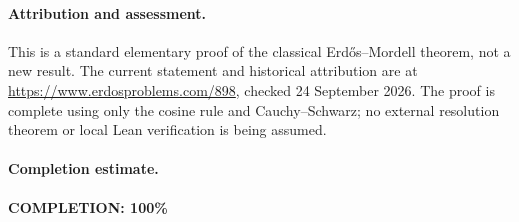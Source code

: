 \paragraph{Attribution and assessment.}
This is a standard elementary proof of the classical
Erd\H{o}s--Mordell theorem, not a new result.
The current statement and historical attribution are at
\url{https://www.erdosproblems.com/898}, checked 24 September 2026.
The proof is complete using only the cosine rule and
Cauchy--Schwarz; no external resolution theorem or local
Lean verification is being assumed.

\paragraph{Completion estimate.}
\textbf{COMPLETION: 100\%}
